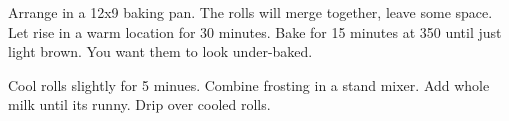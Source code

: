 \begin{recipe}
Arrange in a 12x9 baking pan. The rolls will merge together, leave some space. 
Let rise in a warm location for 30 minutes. 
Bake for 15 minutes at 350\degree{} until just light brown. 
You want them to look under-baked.


Cool rolls slightly for 5 minues. Combine frosting in a stand mixer. Add whole milk until its runny. Drip over cooled rolls. 

\end{recipe}
